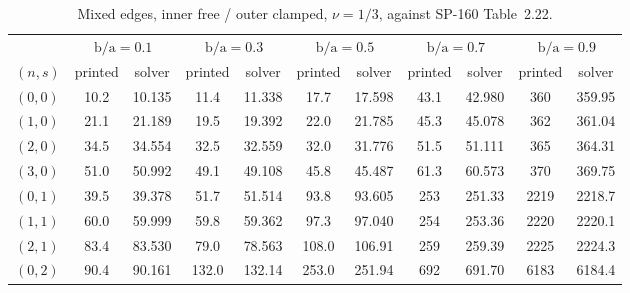 \documentclass[11pt]{article}
\newcommand{\ba}{\mbox{b/a}}
\begin{document}
\begin{table}[htbp]\centering\footnotesize
\caption{Mixed edges, inner free / outer clamped, $\nu=1/3$, against SP-160
Table~2.22.}
\label{tab:sm-t222-nu13}
\begin{tabular}{lcccccccccc}
\toprule
& \multicolumn{2}{c}{$\ba=0.1$} & \multicolumn{2}{c}{$\ba=0.3$}
& \multicolumn{2}{c}{$\ba=0.5$} & \multicolumn{2}{c}{$\ba=0.7$}
& \multicolumn{2}{c}{$\ba=0.9$}\\
\cmidrule(lr){2-3}\cmidrule(lr){4-5}\cmidrule(lr){6-7}\cmidrule(lr){8-9}\cmidrule(lr){10-11}
$(n,s)$ & printed & solver & printed & solver & printed & solver
& printed & solver & printed & solver\\
\midrule
$(0,0)$ & 10.2 & 10.135 & 11.4 & 11.338 & 17.7 & 17.598 & 43.1 & 42.980 & 360 & 359.95 \\
$(1,0)$ & 21.1 & 21.189 & 19.5 & 19.392 & 22.0 & 21.785 & 45.3 & 45.078 & 362 & 361.04 \\
$(2,0)$ & 34.5 & 34.554 & 32.5 & 32.559 & 32.0 & 31.776 & 51.5 & 51.111 & 365 & 364.31 \\
$(3,0)$ & 51.0 & 50.992 & 49.1 & 49.108 & 45.8 & 45.487 & 61.3 & 60.573 & 370 & 369.75 \\
$(0,1)$ & 39.5 & 39.378 & 51.7 & 51.514 & 93.8 & 93.605 & 253 & 251.33 & 2219 & 2218.7 \\
$(1,1)$ & 60.0 & 59.999 & 59.8 & 59.362 & 97.3 & 97.040 & 254 & 253.36 & 2220 & 2220.1 \\
$(2,1)$ & 83.4 & 83.530 & 79.0 & 78.563 & 108.0 & 106.91 & 259 & 259.39 & 2225 & 2224.3 \\
$(0,2)$ & 90.4 & 90.161 & 132.0 & 132.14 & 253.0 & 251.94 & 692 & 691.70 & 6183 & 6184.4 \\
\bottomrule
\end{tabular}
\end{table}
\end{document}
